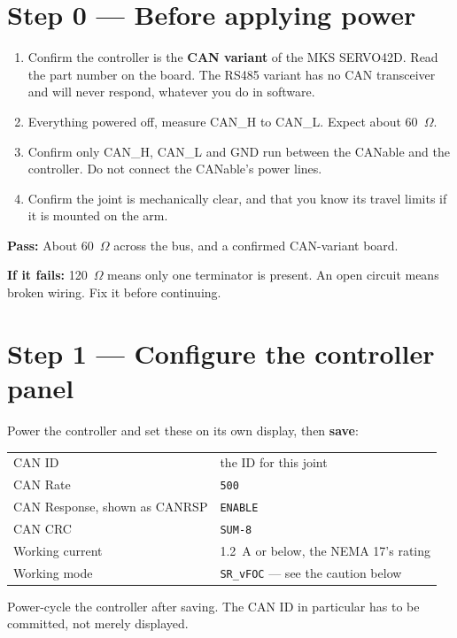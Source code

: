 \documentclass[11pt,letterpaper]{article}
\newcommand{\passif}[1]{\par\vspace{2pt}\noindent\textbf{\color{okgreen}Pass:} #1\par\vspace{4pt}}
\newcommand{\failif}[1]{\noindent\textbf{If it fails:} #1\par\vspace{6pt}}
\begin{document}
\section*{Step 0 --- Before applying power}
\begin{enumerate}[leftmargin=*]
    \item Confirm the controller is the \textbf{CAN variant} of the MKS SERVO42D.
          Read the part number on the board. The RS485 variant has no CAN
          transceiver and will never respond, whatever you do in software.
    \item Everything powered off, measure CAN\_H to CAN\_L. Expect about
          60~$\Omega$.
    \item Confirm only CAN\_H, CAN\_L and GND run between the CANable and the
          controller. Do not connect the CANable's power lines.
    \item Confirm the joint is mechanically clear, and that you know its travel
          limits if it is mounted on the arm.
\end{enumerate}
\passif{About 60~$\Omega$ across the bus, and a confirmed CAN-variant board.}
\failif{120~$\Omega$ means only one terminator is present. An open circuit means
broken wiring. Fix it before continuing.}

\section*{Step 1 --- Configure the controller panel}

Power the controller and set these on its own display, then \textbf{save}:

\begin{center}
\begin{tabular}{ll}
\toprule
CAN ID & the ID for this joint \\
CAN Rate & \texttt{500} \\
CAN Response, shown as CANRSP & \texttt{ENABLE} \\
CAN CRC & \texttt{SUM-8} \\
Working current & 1.2~A or below, the NEMA 17's rating \\
Working mode & \texttt{SR\_vFOC} --- see the caution below \\
\bottomrule
\end{tabular}
\end{center}

Power-cycle the controller after saving. The CAN ID in particular has to be
committed, not merely displayed.
\end{document}
